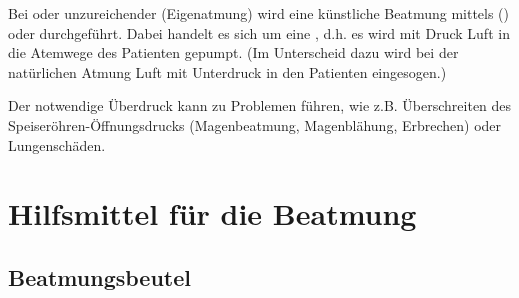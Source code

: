 Bei  oder unzureichender  (Eigenatmung) wird
eine künstliche Beatmung mittels
 () oder 
durchgeführt. Dabei handelt es sich um eine , d.h. es
wird mit Druck Luft in die Atemwege des Patienten gepumpt. (Im Unterscheid dazu
wird bei der natürlichen Atmung Luft mit Unterdruck in den Patienten
eingesogen.) 

Der notwendige Überdruck kann zu Problemen führen, wie z.B. Überschreiten des
Speiseröhren-Öffnungsdrucks (Magenbeatmung, Magenblähung, Erbrechen) oder
Lungenschäden.



% 
% 
% 
% 
% 
% 
% 
% 
% 

\section{Hilfsmittel für die Beatmung}
\subsection{Beatmungsbeutel}
\label{topic:beatmungsbeutel}



